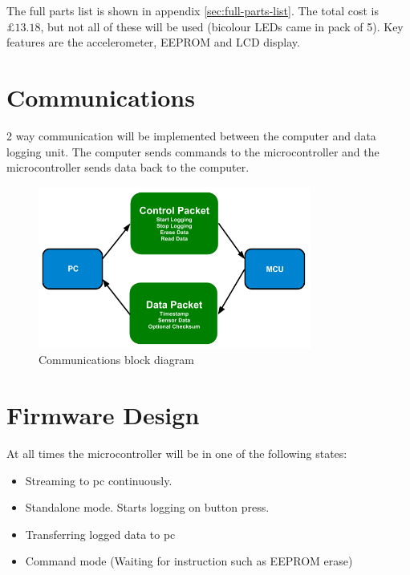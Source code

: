 \documentclass[a4paper,11pt]{article}  %
\begin{document}
The full parts list is shown in appendix
\ref{sec:full-parts-list}. The total cost is $\pounds 13.18$, but not
all of these will be used (bicolour LEDs came in pack of 5). Key
features are the accelerometer, EEPROM and LCD display.

\section{Communications}
\label{sec:communications}

2 way communication will be implemented between the computer and data
logging unit. The computer sends commands to the microcontroller and
the microcontroller sends data back to the computer.

\begin{figure}[!h]
  \begin{center}
    \includegraphics[width=0.8\textwidth]{comms_diagram.png}
  \end{center}
  \caption{Communications block diagram}
  \label{fig:commsdiag}
\end{figure}

\section{Firmware Design}
\label{sec:firmware-design}

At all times the microcontroller will be in one of the following
states:

\begin{itemize}
  \item Streaming to pc continuously.
  \item Standalone mode. Starts logging on button press.
  \item Transferring logged data to pc
  \item Command mode (Waiting for instruction such as EEPROM erase)
\end{itemize}
\end{document}
